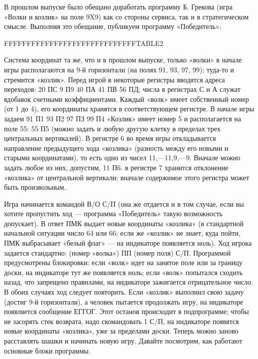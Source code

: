 \documentclass[11pt,a4paper,oneside]{article}
\begin{document}
В прошлом выпуске было обещано доработать программу Б. Грекова (игра «Волки и козлик» на поле 9X9) как со стороны сервиса, так и в стратегическом смысле. Выполняя это обещание, публикуем программу «Победитель»:

FFFFFFFFFFFFFFFFFFFFFFFFFFFFFTABLE2

Система координат та же, что и в прошлом выпуске, только «волки» в начале игры располагаются на 9-й горизонтали (на полях 91, 93, 97, 99); туда-то и стремится «козлик». Перед игрой в некоторые регистры вводятся адреса переходов: 20 ПС 9 П9 40 ПА 41 ПВ 56 ПД; числа в регистрах С и А служат вдобавок счетными коэффициентами. Каждый «волк» имеет собственный номер (от 1 до 4), его координаты хранятся в соответствующем регистре. В начале игры задаем 91 П1 93 П2 97 ПЗ 99 П4 «Козлик» имеет номер 5 и располагается на поле 55: 55 П5 (можно задать и любую другую клетку в пределах трех центральных вертикалей). В регистре 6 во время игры откладывается направление предыдущего хода «козлика» (разность между его новыми и старыми координатами), то есть одно из чисел 11,—11,9,—9. Вначале можно задать любое из них, допустим, 11 П6. в регистре 7 хранится отклонение «козлика» от центральной вертикали; вначале содержимое этого регистра может быть произвольным.

Игра начинается командой В/О С/П (она же отдается и в том случае, если вы хотите пропустить ход — программа «Победитель» такую возможность допускает). В ответ ПМК выдает новые координаты «козлика» (в стандартной начальной ситуации число 64 или 66; если же «козлик» не знает, куда пойти, ПМК выбрасывает «белый флаг» — на индикаторе появляется ноль). Ход игрока задается стандартно: (номер «волка») ПП (номер поля) С/П. Программой предусмотрены блокировки: если «волк» идет на занятое поле или за границу доски, на индикаторе тут же появляется ноль; если «волк» попытался сходить назад, что запрещено правилами, на индикаторе зажигается отрицательное число. В обоих случаях ход следует повторить. Если «козлик» выполнил свою задачу (достиг 9-й горизонтали), а человек пытается продолжать игру, на индикаторе появляется сообщение ЕГГОГ. Этот останов происходит в подпрограмме; чтобы не засорять стек возврата, надо скомандовать 1 С/П, на индикаторе появятся новые координаты «козлика», уже за пределами доски. Теперь  можно заново расставлять шашки и начинать новую игру. Давайте посмотрим, как работают основные блоки программы.
\end{document}
